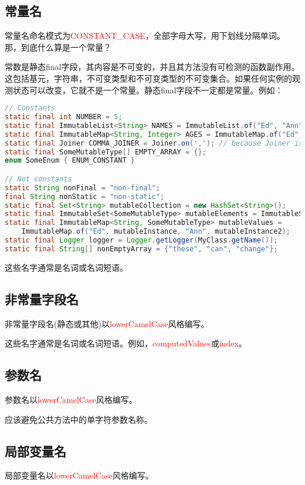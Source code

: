 \documentclass[cn,11pt,chinese]{elegantbook}
\begin{document}
\subsection{常量名}
常量名命名模式为\textcolor{red}{CONSTANT\_CASE}，全部字母大写，用下划线分隔单词。那，到底什么算是一个常量？

常数是静态final字段，其内容是不可变的，并且其方法没有可检测的函数副作用。这包括基元，字符串，不可变类型和不可变类型的不可变集合。如果任何实例的观测状态可以改变，它就不是一个常量。静态final字段不一定都是常量。例如：
\begin{lstlisting}[language=java]
// Constants
static final int NUMBER = 5;
static final ImmutableList<String> NAMES = ImmutableList.of("Ed", "Ann");
static final ImmutableMap<String, Integer> AGES = ImmutableMap.of("Ed", 35, "Ann", 32);
static final Joiner COMMA_JOINER = Joiner.on(','); // because Joiner is immutable
static final SomeMutableType[] EMPTY_ARRAY = {};
enum SomeEnum { ENUM_CONSTANT }

// Not constants
static String nonFinal = "non-final";
final String nonStatic = "non-static";
static final Set<String> mutableCollection = new HashSet<String>();
static final ImmutableSet<SomeMutableType> mutableElements = ImmutableSet.of(mutable);
static final ImmutableMap<String, SomeMutableType> mutableValues =
	ImmutableMap.of("Ed", mutableInstance, "Ann", mutableInstance2);
static final Logger logger = Logger.getLogger(MyClass.getName());
static final String[] nonEmptyArray = {"these", "can", "change"};
\end{lstlisting}

这些名字通常是名词或名词短语。

\subsection{非常量字段名}
非常量字段名(静态或其他)以\textcolor{red}{lowerCamelCase}风格编写。

这些名字通常是名词或名词短语。例如，\textcolor{red}{computedValues}或\textcolor{red}{index}。

\subsection{参数名}
参数名以\textcolor{red}{lowerCamelCase}风格编写。

应该避免公共方法中的单字符参数名称。

\subsection{局部变量名}
局部变量名以\textcolor{red}{lowerCamelCase}风格编写。
\end{document}
